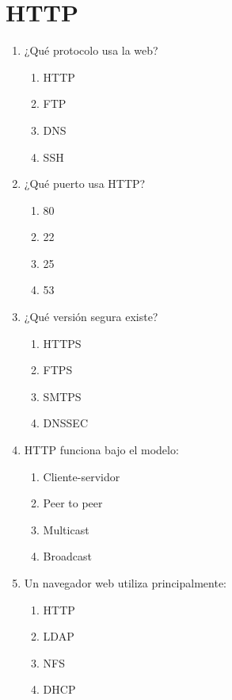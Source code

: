 \documentclass[12pt]{article}
\begin{document}
\section*{HTTP}

\begin{enumerate}[label=\textbf{HTTP-\arabic*.}]

\item ¿Qué protocolo usa la web?
\begin{enumerate}[label=\alph*)]
\item HTTP
\item FTP
\item DNS
\item SSH
\end{enumerate}

\item ¿Qué puerto usa HTTP?
\begin{enumerate}[label=\alph*)]
\item 80
\item 22
\item 25
\item 53
\end{enumerate}

\item ¿Qué versión segura existe?
\begin{enumerate}[label=\alph*)]
\item HTTPS
\item FTPS
\item SMTPS
\item DNSSEC
\end{enumerate}

\item HTTP funciona bajo el modelo:
\begin{enumerate}[label=\alph*)]
\item Cliente-servidor
\item Peer to peer
\item Multicast
\item Broadcast
\end{enumerate}

\item Un navegador web utiliza principalmente:
\begin{enumerate}[label=\alph*)]
\item HTTP
\item LDAP
\item NFS
\item DHCP
\end{enumerate}

\end{enumerate}
\end{document}
